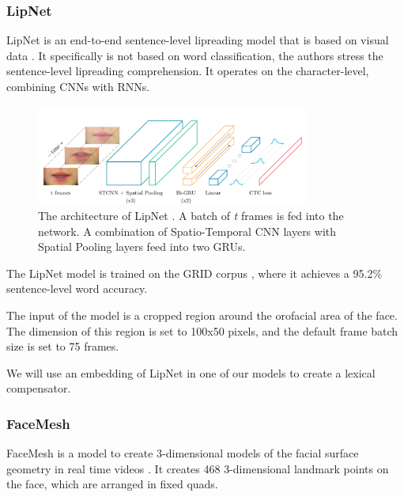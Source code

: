 \subsubsection{LipNet}

LipNet is an end-to-end sentence-level lipreading model that is based on visual data \cite{assael2016lipnet}. It specifically is not based on word classification, the authors stress the sentence-level lipreading comprehension. It operates on the character-level, combining CNNs with RNNs.

\begin{figure}
    \centering
    \includegraphics[width=0.8\textwidth]{res/lipnet.png}
    \caption{The architecture of LipNet \cite{assael2016lipnet}. A batch of \textit{t} frames is fed into the network. A combination of Spatio-Temporal CNN layers with Spatial Pooling layers feed into two GRUs.}
    \label{fig:lipnet}
\end{figure}

The LipNet model is trained on the GRID corpus \cite{cooke2006grid}, where it achieves a 95.2\% sentence-level word accuracy.

The input of the model is a cropped region around the orofacial area of the face. The dimension of this region is set to 100x50 pixels, and the default frame batch size is set to 75 frames.

We will use an embedding of LipNet in one of our models to create a lexical compensator.

\subsubsection{FaceMesh}


FaceMesh is a model to create 3-dimensional models of the facial surface geometry in real time videos \cite{kartynnik2019facemesh}. It creates 468 3-dimensional landmark points on the face, which are arranged in fixed quads.

